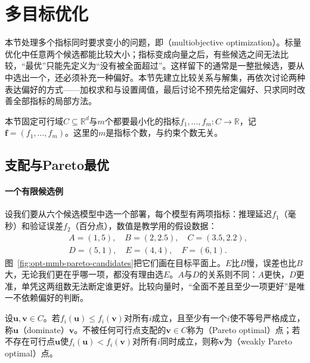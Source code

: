 \section{多目标优化}
\label{sec:opt-mmb-multiobjective}

本节处理多个指标同时要求变小的问题，即（multiobjective optimization）。标量优化中任意两个候选都能比较大小；指标变成向量之后，有些候选之间无法比较，“最优”只能先定义为“没有被全面超过”。这样留下的通常是一整批候选，要从中选出一个，还必须补充一种偏好。本节先建立比较关系与解集，再依次讨论两种表达偏好的方式——加权求和与设置阈值，最后讨论不预先给定偏好、只求同时改善全部指标的局部方法。

本节固定可行域$C\subseteq\mathbb R^d$与$m$个都要最小化的指标$f_1,\dots,f_m:C\to\mathbb R$，记$\bm f=(f_1,\dots,f_m)$。这里的$m$是指标个数，与约束个数无关。

\subsection{支配与Pareto最优}
\label{sec:opt-mmb-pareto}

\paragraph{一个有限候选例}
设我们要从六个候选模型中选一个部署，每个模型有两项指标：推理延迟$f_1$（毫秒）和验证误差$f_2$（百分点），数值是教学用的假设数据：
\begin{equation}
\label{eq:opt-mmb-six-candidates}
\begin{aligned}
&A=(1,5),\quad B=(2,2.5),\quad C=(3.5,2.2),\\
&D=(5,1),\quad E=(4,4),\quad F=(6,1).
\end{aligned}
\end{equation}
图~\ref{fig:opt-mmb-pareto-candidates}把它们画在目标平面上。$E$比$B$慢，误差也比$B$大，无论我们更在乎哪一项，都没有理由选$E$。$A$与$D$的关系则不同：$A$更快，$D$更准，单凭这两组数无法断定谁更好。比较向量时，“全面不差且至少一项更好”是唯一不依赖偏好的判断。

\begin{definition}[支配与Pareto最优]
\label{def:opt-mmb-pareto}
设$\bm u,\bm v\in C$。若$f_i(\bm u)\leq f_i(\bm v)$对所有$i$成立，且至少有一个$i$使不等号严格成立，称$\bm u$（dominate）$\bm v$。不被任何可行点支配的$\bm v\in C$称为（Pareto optimal）点；若不存在可行点$\bm u$使$f_i(\bm u)<f_i(\bm v)$对所有$i$同时成立，则称$\bm v$为（weakly Pareto optimal）点。
\end{definition}


